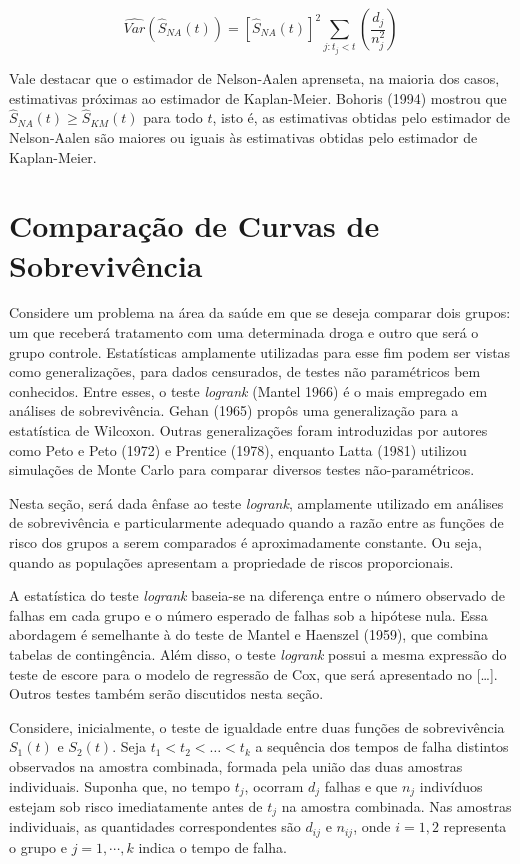 \documentclass[
  12pt,
  letterpaper,
  DIV=11,
  numbers=noendperiod]{scrreprt}
\begin{document}
\[
\hat{Var}(\hat{S}_{NA}(t)) = \left[ \hat{S}_{NA}(t) \right]^{2} \sum_{j:t_{j} < t} \left( \dfrac{d_{j}}{n_{j}^{2}} \right)
\]

Vale destacar que o estimador de Nelson-Aalen aprenseta, na maioria dos
casos, estimativas próximas ao estimador de Kaplan-Meier. Bohoris (1994)
mostrou que \(\hat{S}_{NA}(t) \geq \hat{S}_{KM}(t)\) para todo \(t\),
isto é, as estimativas obtidas pelo estimador de Nelson-Aalen são
maiores ou iguais às estimativas obtidas pelo estimador de Kaplan-Meier.

\section{Comparação de Curvas de
Sobrevivência}\label{comparauxe7uxe3o-de-curvas-de-sobrevivuxeancia}

Considere um problema na área da saúde em que se deseja comparar dois
grupos: um que receberá tratamento com uma determinada droga e outro que
será o grupo controle. Estatísticas amplamente utilizadas para esse fim
podem ser vistas como generalizações, para dados censurados, de testes
não paramétricos bem conhecidos. Entre esses, o teste \emph{logrank}
(Mantel 1966) é o mais empregado em análises de sobrevivência. Gehan
(1965) propôs uma generalização para a estatística de Wilcoxon. Outras
generalizações foram introduzidas por autores como Peto e Peto (1972) e
Prentice (1978), enquanto Latta (1981) utilizou simulações de Monte
Carlo para comparar diversos testes não-paramétricos.

Nesta seção, será dada ênfase ao teste \emph{logrank}, amplamente
utilizado em análises de sobrevivência e particularmente adequado quando
a razão entre as funções de risco dos grupos a serem comparados é
aproximadamente constante. Ou seja, quando as populações apresentam a
propriedade de riscos proporcionais.

A estatística do teste \emph{logrank} baseia-se na diferença entre o
número observado de falhas em cada grupo e o número esperado de falhas
sob a hipótese nula. Essa abordagem é semelhante à do teste de Mantel e
Haenszel (1959), que combina tabelas de contingência. Além disso, o
teste \emph{logrank} possui a mesma expressão do teste de escore para o
modelo de regressão de Cox, que será apresentado no {[}\ldots{]}. Outros
testes também serão discutidos nesta seção.

Considere, inicialmente, o teste de igualdade entre duas funções de
sobrevivência \(S_{1}(t)\) e \(S_{2}(t)\). Seja
\(t_{1} < t_{2} < \ldots < t_{k}\) a sequência dos tempos de falha
distintos observados na amostra combinada, formada pela união das duas
amostras individuais. Suponha que, no tempo \(t_{j}\), ocorram \(d_{j}\)
falhas e que \(n_{j}\) indivíduos estejam sob risco imediatamente antes
de \(t_{j}\) na amostra combinada. Nas amostras individuais, as
quantidades correspondentes são \(d_{ij}\) e \(n_{ij}\), onde
\(i = 1, 2\) representa o grupo e \(j = 1, \cdots, k\) indica o tempo de
falha.
\end{document}
